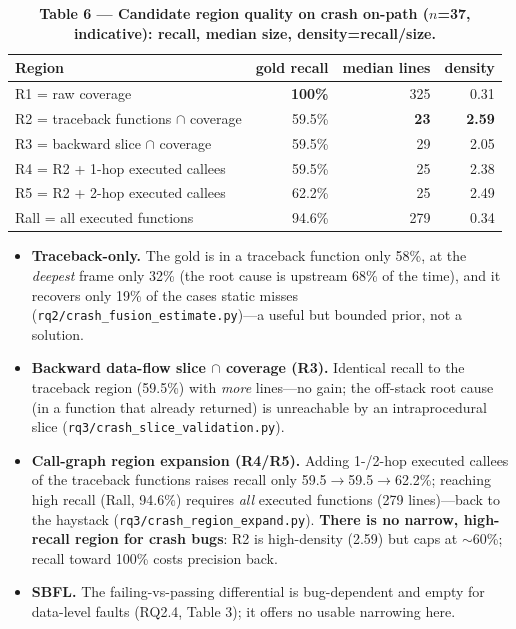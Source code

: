\documentclass[11pt]{article}
\newcommand{\code}[1]{\texttt{#1}}
\begin{document}
\begin{table}[t]
\centering\small
\caption*{\textbf{Table 6 --- Candidate region quality on crash on-path ($n$=37, indicative): recall, median size, density=recall/size.}}
\setlength{\tabcolsep}{8pt}
\begin{tabular}{lrrr}
\toprule
Region & gold recall & median lines & density \\
\midrule
R1 = raw coverage & \textbf{100\%} & 325 & 0.31 \\
R2 = traceback functions $\cap$ coverage & 59.5\% & \textbf{23} & \textbf{2.59} \\
R3 = backward slice $\cap$ coverage & 59.5\% & 29 & 2.05 \\
R4 = R2 + 1-hop executed callees & 59.5\% & 25 & 2.38 \\
R5 = R2 + 2-hop executed callees & 62.2\% & 25 & 2.49 \\
Rall = all executed functions & 94.6\% & 279 & 0.34 \\
\bottomrule
\end{tabular}
\end{table}

\begin{itemize}
  \item \textbf{Traceback-only.} The gold is in a traceback function only 58\%, at the \emph{deepest} frame only 32\% (the root cause is upstream 68\% of the time), and it recovers only 19\% of the cases static misses (\code{rq2/crash\_fusion\_estimate.py})---a useful but bounded prior, not a solution.
  \item \textbf{Backward data-flow slice $\cap$ coverage (R3).} Identical recall to the traceback region (59.5\%) with \emph{more} lines---no gain; the off-stack root cause (in a function that already returned) is unreachable by an intraprocedural slice (\code{rq3/crash\_slice\_validation.py}).
  \item \textbf{Call-graph region expansion (R4/R5).} Adding 1-/2-hop executed callees of the traceback functions raises recall only 59.5$\rightarrow$59.5$\rightarrow$62.2\%; reaching high recall (Rall, 94.6\%) requires \emph{all} executed functions (279 lines)---back to the haystack (\code{rq3/crash\_region\_expand.py}). \textbf{There is no narrow, high-recall region for crash bugs}: R2 is high-density (2.59) but caps at $\sim$60\%; recall toward 100\% costs precision back.
  \item \textbf{SBFL.} The failing-vs-passing differential is bug-dependent and empty for data-level faults (RQ2.4, Table 3); it offers no usable narrowing here.
\end{itemize}
\end{document}
